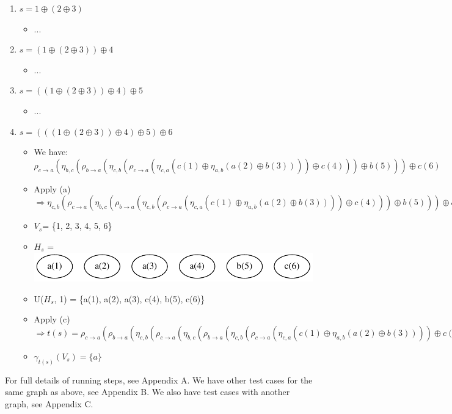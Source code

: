 \documentclass[a4paper, 12pt]{article}
\begin{document}
\begin{enumerate}
\item $s=1\oplus(2\oplus3)$
\begin{itemize}
\item ...
\end{itemize}

\item $s=(1\oplus(2\oplus3))\oplus4$
\begin{itemize}
\item ...
\end{itemize}

\item $s=((1\oplus(2\oplus3))\oplus4)\oplus5$
\begin{itemize}
\item ...
\end{itemize}

\item $s=(((1\oplus(2\oplus3))\oplus4)\oplus5)\oplus6$
\begin{itemize}
\item We have: $\rho_{c\rightarrow a}(\eta_{b,c}(\rho_{b\rightarrow a}(\eta_{c,b}(\rho_{c\rightarrow a}(\eta_{c,a}(c(1)\oplus\eta_{a,b}(a(2)\oplus b(3))))\oplus c(4)))\oplus b(5)))\oplus c(6)$
\item Apply (a) $\Longrightarrow\eta_{c,b}(\rho_{c\rightarrow a}(\eta_{b,c}(\rho_{b\rightarrow a}(\eta_{c,b}(\rho_{c\rightarrow a}(\eta_{c,a}(c(1)\oplus\eta_{a,b}(a(2)\oplus b(3))))\oplus c(4)))\oplus b(5)))\oplus c(6))$
\item {$V_s$}= \{1, 2, 3, 4, 5, 6\} 
\item {$H_s$} = \includegraphics[scale=0.5]{image/example7}
\item U({$H_s$}, 1) = \{a(1), a(2), a(3), c(4), b(5), c(6)\} 
\item Apply (c) $\Longrightarrow t(s)=\rho_{c\rightarrow a}(\rho_{b\rightarrow a}(\eta_{c,b}(\rho_{c\rightarrow a}(\eta_{b,c}(\rho_{b\rightarrow a}(\eta_{c,b}(\rho_{c\rightarrow a}(\eta_{c,a}(c(1)\oplus\eta_{a,b}(a(2)\oplus b(3))))\oplus c(4)))\oplus b(5)))\oplus c(6))))$ 
\item $\gamma_{t(s)}(V_{s})=\{a\}$ 
\end{itemize}
\end{enumerate}
For full details of running steps, see Appendix A.\newline
We have other test cases for the same graph as above, see Appendix B.\newline
We also have test cases with another graph, see Appendix C.
\end{document}
